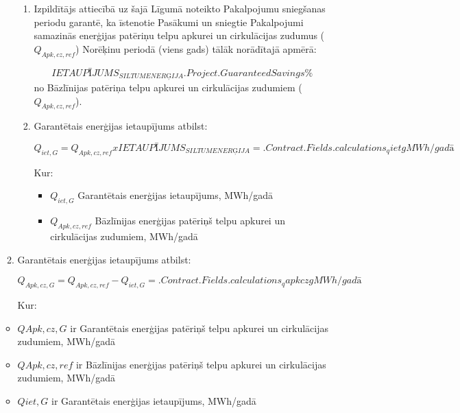 \begin{enumerate}
\begin{enumerate}
\begin{enumerate}
	\item Izpildītājs attiecībā uz šajā Līgumā noteikto Pakalpojumu sniegšanas periodu garantē, ka īstenotie Pasākumi un sniegtie Pakalpojumi samazinās enerģijas patēriņu telpu apkurei un cirkulācijas zudumus ($Q_{Apk,cz,ref}$) Norēķinu periodā (viens gads) tālāk norādītajā apmērā:

	\[IETAUPĪJUMS_{SILTUMENERĢIJA} \iffalse input project.savings value="{{.Project.GuaranteedSavings}}" type="number" \fi {{.Project.GuaranteedSavings}} \% \] no Bāzlīnijas patēriņa telpu apkurei un cirkulācijas zudumiem ($Q_{Apk,cz,ref}$).

	\item Garantētais enerģijas ietaupījums atbilst:

\[Q_{iet,G} = Q_{Apk, cz, ref} x IETAUPĪJUMS_{SILTUMENERĢIJA} = {{.Contract.Fields.calculations_qietg}} MWh/gadā\]


Kur:
\begin{itemize}
	\item $Q_{iet,G}$	Garantētais enerģijas ietaupījums, MWh/gadā
	\item $Q_{Apk,cz,ref}$	Bāzlīnijas enerģijas patēriņš telpu apkurei un cirkulācijas zudumiem, MWh/gadā
\end{itemize}

\end{enumerate}

\item Garantētais enerģijas ietaupījums atbilst:

\[Q_{Apk,cz,G} = Q_{Apk,cz,ref} - Q_{iet,G} = {{.Contract.Fields.calculations_qapkczg}} MWh/gadā\]

Kur:
\end{enumerate}
\begin{itemize}
	\item $QApk,cz,G$	ir Garantētais enerģijas patēriņš telpu apkurei un cirkulācijas zudumiem, MWh/gadā
	\item $QApk,cz,ref$	ir Bāzlīnijas enerģijas patēriņš telpu apkurei un cirkulācijas zudumiem, MWh/gadā
	\item $Qiet,G$	ir Garantētais enerģijas ietaupījums, MWh/gadā
\end{itemize}
\end{enumerate}
